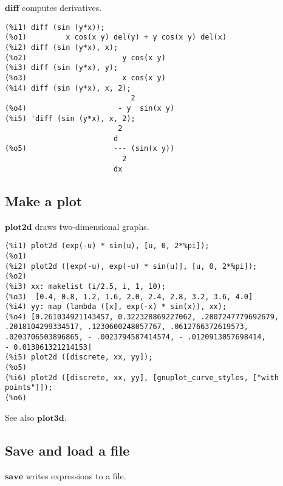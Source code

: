 \documentclass[12pt]{article}
\begin{document}
$\mathbf{diff}$ computes derivatives.

\begin{verbatim}
(%i1) diff (sin (y*x));
(%o1)         x cos(x y) del(y) + y cos(x y) del(x)
(%i2) diff (sin (y*x), x);
(%o2)                      y cos(x y)
(%i3) diff (sin (y*x), y);
(%o3)                      x cos(x y)
(%i4) diff (sin (y*x), x, 2);
                             2
(%o4)                     - y  sin(x y)
(%i5) 'diff (sin (y*x), x, 2);
                          2
                         d
(%o5)                    --- (sin(x y))
                           2
                         dx
\end{verbatim}

\subsection{Make a plot}

$\mathbf{plot2d}$ draws two-dimensional graphs.

\begin{verbatim}
(%i1) plot2d (exp(-u) * sin(u), [u, 0, 2*%pi]);
(%o1) 
(%i2) plot2d ([exp(-u), exp(-u) * sin(u)], [u, 0, 2*%pi]);
(%o2) 
(%i3) xx: makelist (i/2.5, i, 1, 10);
(%o3)  [0.4, 0.8, 1.2, 1.6, 2.0, 2.4, 2.8, 3.2, 3.6, 4.0]
(%i4) yy: map (lambda ([x], exp(-x) * sin(x)), xx);
(%o4) [0.261034921143457, 0.322328869227062, .2807247779692679, 
.2018104299334517, .1230600248057767, .0612766372619573, 
.0203706503896865, - .0023794587414574, - .0120913057698414, 
- 0.013861321214153]
(%i5) plot2d ([discrete, xx, yy]);
(%o5) 
(%i6) plot2d ([discrete, xx, yy], [gnuplot_curve_styles, ["with points"]]);
(%o6)
\end{verbatim}

See also $\mathbf{plot3d}$.

\subsection{Save and load a file}

$\mathbf{save}$ writes expressions to a file.
\end{document}
